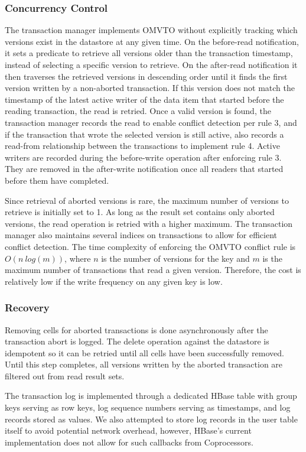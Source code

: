 \documentclass[10pt,final,journal]{IEEEtran}
\begin{document}
\subsubsection{Concurrency Control}
The transaction manager implements OMVTO without explicitly tracking which versions exist in the datastore at any given time. On the before-read notification, it sets a predicate to retrieve all versions older than the transaction timestamp, instead of selecting a specific version to retrieve. On the after-read notification it then traverses the retrieved versions in descending order until it finds the first version written by a non-aborted transaction. If this version does not match the timestamp of the latest active writer of the data item that started before the reading transaction, the read is retried. Once a valid version is found, the transaction manager records the read to enable conflict detection per rule 3, and if the transaction that wrote the selected version is still active, also records a read-from relationship between the transactions to implement rule 4. Active writers are recorded during the before-write operation after enforcing rule 3. They are removed in the after-write notification once all readers that started before them have completed.

Since retrieval of aborted versions is rare, the maximum number of versions to retrieve is initially set to 1. As long as the result set contains only aborted versions, the read operation is retried with a higher maximum. The transaction manager also maintains several indices on transactions to allow for efficient conflict detection. The time complexity of enforcing the OMVTO conflict rule is $O(n \: log(m))$, where $n$ is the number of versions for the key and $m$ is the maximum number of transactions that read a given version. Therefore, the cost is relatively low if the write frequency on any given key is low.

\subsubsection{Recovery}
Removing cells for aborted transactions is done asynchronously after the transaction abort is logged. The delete operation against the datastore is idempotent so it can be retried until all cells have been successfully removed. Until this step completes, all versions written by the aborted transaction are filtered out from read result sets.

The transaction log is implemented through a dedicated HBase table with group keys serving as row keys, log sequence numbers serving as timestamps, and log records stored as values. We also attempted to store log records in the user table itself to avoid potential network overhead, however, HBase's current implementation does not allow for such callbacks from Coprocessors.
\end{document}

